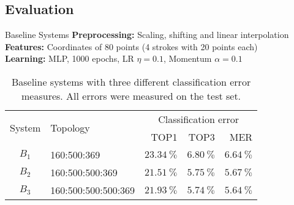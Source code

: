\subsection{Evaluation}
\begin{frame}{Baseline Systems}
    \textbf{Preprocessing:} Scaling, shifting and linear interpolation\\
    \textbf{Features:} Coordinates of 80 points (4 strokes with 20 points each)\\
    \textbf{Learning:} MLP, 1000 epochs, LR $\eta=0.1$, Momentum $\alpha=0.1$
\begin{table}[h]
    \centering
    \begin{tabular}{clrrr}
    \toprule
    \multirow{2}{*}{System}  & \multirow{2}{*}{Topology} & \multicolumn{3}{c}{Classification error}\\ 
          &                         & TOP1                   & TOP3                  & MER \\\midrule
    $B_1$ & 160:500:369             & $\SI{23.34}{\percent}$ & $\SI{6.80}{\percent}$ & $\SI{6.64}{\percent}$ \\
    $B_2$ & 160:500:500:369         & \underline{$\SI{21.51}{\percent}$} & $\SI{5.75}{\percent}$ & $\SI{5.67}{\percent}$ \\
    $B_3$ & 160:500:500:500:369     & $\SI{21.93}{\percent}$ & \underline{$\SI{5.74}{\percent}$} & \underline{$\SI{5.64}{\percent}$} \\
    \bottomrule
    \end{tabular}
    \caption{Baseline systems with three different classification error measures.
             All errors were measured on the test set.}
\label{table:baseline-systems}
\end{table}
\end{frame}


